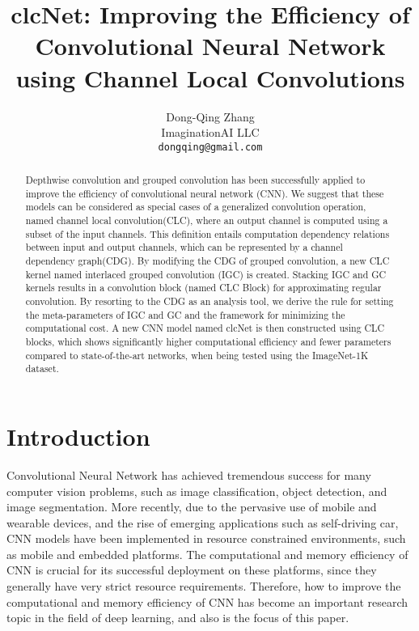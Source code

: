 \documentclass[10pt,twocolumn,letterpaper]{article}
\begin{document}
\title{clcNet: Improving the Efficiency of Convolutional Neural Network using Channel Local Convolutions}

\author{Dong-Qing Zhang\\
ImaginationAI LLC\\
{\tt\small dongqing@gmail.com}
}

\maketitle

\begin{abstract}
Depthwise convolution and grouped convolution has been successfully applied to improve the efficiency of convolutional neural network (CNN). We suggest that these models can be considered as special cases of a generalized convolution operation, named channel local convolution(CLC), where an output channel is computed using a subset of the input channels. This definition entails computation dependency relations between input and output channels, which can be represented by a channel dependency graph(CDG). By modifying the CDG of grouped convolution, a new CLC kernel named interlaced grouped convolution (IGC) is created. Stacking IGC and GC kernels results in a convolution block (named CLC Block) for approximating regular convolution. By resorting to the CDG as an analysis tool, we derive the rule for setting the meta-parameters of IGC and GC and the framework for minimizing the computational cost. A new CNN model named clcNet is then constructed using CLC blocks, which shows significantly higher computational efficiency and fewer parameters compared to state-of-the-art networks, when being tested using the ImageNet-1K dataset. 
\end{abstract}

\section{Introduction}

Convolutional Neural Network has achieved tremendous success for many computer vision problems, such as image classification\cite{alexnet2012krizhevsky}, object detection\cite{rcnn2014girshick}, and image segmentation\cite{fcn2015long}. More recently, due to the pervasive use of mobile and wearable devices, and the rise of emerging applications such as self-driving car, CNN models have been implemented in  resource constrained environments, such as mobile and embedded platforms. The computational and memory efficiency of CNN is crucial for its successful deployment on these platforms, since they generally have very strict resource requirements. Therefore, how to improve the computational and memory efficiency of CNN has become an important research topic in the field of deep learning, and also is the focus of this paper.
\end{document}
